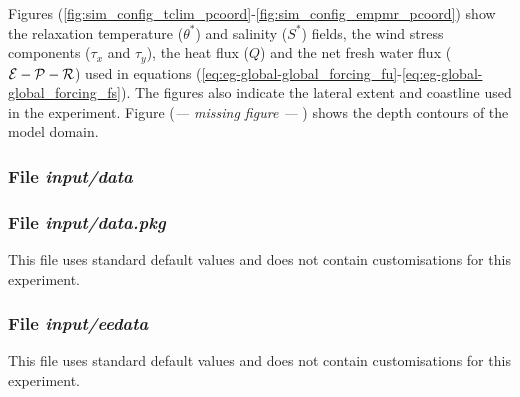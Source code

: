 



Figures (\ref{fig:sim_config_tclim_pcoord}-\ref{fig:sim_config_empmr_pcoord})
show the relaxation temperature ($\theta^{\ast}$) and salinity ($S^{\ast}$) 
fields, the wind stress components ($\tau_x$ and $\tau_y$), the heat flux ($Q$)
and the net fresh water flux (${\cal E} - {\cal P} - {\cal R}$) used
in equations 
(\ref{eq:eg-global-global_forcing_fu}-\ref{eq:eg-global-global_forcing_fs}).
The figures also indicate the lateral extent and coastline used in the 
experiment. Figure ({\it --- missing figure --- }) %
shows the depth contours of the model domain.

\subsubsection{File {\it input/data}}



\subsubsection{File {\it input/data.pkg}}

This file uses standard default values and does not contain
customisations for this experiment.

\subsubsection{File {\it input/eedata}}

This file uses standard default values and does not contain
customisations for this experiment.

